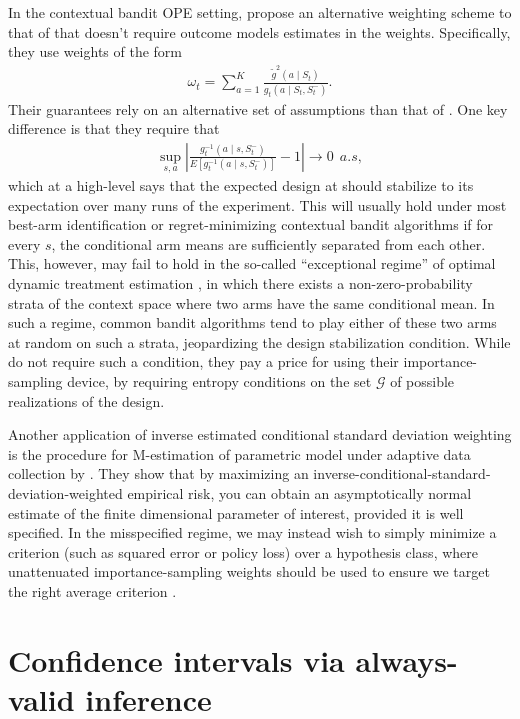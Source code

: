 In the contextual bandit OPE setting, \cite{zhan2021off} propose an alternative weighting scheme to that of \cite{bibaut2021post} that doesn't require outcome models estimates in the weights. Specifically, they use weights of the form
\begin{align}
    \omega_t = \sum_{a=1}^K \frac{\widetilde{g}^2(a \mid S_t)}{g_t(a \mid S_t, S_t^-)}.
\end{align}
Their guarantees rely on an alternative set of assumptions than that of \cite{bibaut2021post}. One key difference is that they require that 
\begin{align}
\sup_{s,a} \left\lvert \frac{g_t^{-1}(a \mid s, S_t^-)}{E[g_t^{-1}(a \mid s, S_t^-)]} - 1\right\rvert \to 0~~ a.s,
\end{align}
which at a high-level says that the expected design at should stabilize to its expectation over many runs of the experiment. This will usually hold under most best-arm identification or regret-minimizing contextual bandit algorithms if for every $s$, the conditional arm means are sufficiently separated from each other. This, however, may fail to hold in the so-called ``exceptional regime'' of optimal dynamic treatment estimation \citep{luedtke2016statistical}, in which there exists a non-zero-probability strata of the context space where two arms have the same conditional mean. In such a regime, common bandit algorithms tend to play either of these two arms at random on such a strata, jeopardizing the design stabilization condition. While \cite{bibaut2021post} do not require such a condition, they pay a price for using their importance-sampling device, by requiring entropy conditions on the set $\mathcal{G}$ of possible realizations of the design.

Another application of inverse estimated conditional standard deviation weighting is the procedure for M-estimation of parametric model under adaptive data collection by \cite{zhang2021statistical}. They show that by maximizing an inverse-conditional-standard-deviation-weighted empirical risk, you can obtain an asymptotically normal estimate of the finite dimensional parameter of interest, provided it is well specified. In the misspecified regime, we may instead wish to simply minimize a criterion (such as squared error or policy loss) over a hypothesis class, where unattenuated importance-sampling weights should be used to ensure we target the right average criterion \citep{bibaut2021risk}.



\section{Confidence intervals via always-valid inference}\label{sec: always valid}

